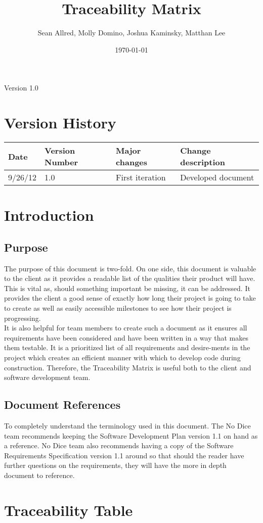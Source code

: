\documentclass [landscape, 12pt] {article}
\title{Traceability Matrix}
\author{Sean Allred, Molly Domino, Joshua Kaminsky, Matthan Lee}
\date{\today}
\newcommand {\tab} {\hspace*{2em}}
\newcommand{\setupintro}{
\renewcommand{\thepage}{}
\maketitle
\begin{center}
\large Version 1.0 \normalsize
\end{center}
\newpage
\setcounter{page}{1}
\renewcommand{\thepage}{\roman{page}}
\tableofcontents 
\newpage
\setcounter{page}{1}
\renewcommand{\thepage}{\arabic{page}}
}
\begin{document}
\setupintro
\section{Version History}
\begin{tabular}{|l|l|l|l|}
\hline
Date & Version Number & Major changes & Change description \\[.5ex] \hline
9/26/12 & 1.0 & First iteration& Developed document \\
\hline

\end {tabular}

\section {Introduction} 
 \subsection {Purpose}
\tab The purpose of this document is two-fold.  On one side, this document is valuable to the client as it provides a readable list of the qualities their product will have.  This is vital as, should something important be missing, it can be addressed.  It provides the client a good sense of exactly how long their project is going to take to create as well as easily accessible milestones to see how their project is progressing.  \\
\tab It is also helpful for team members to create such a document as it ensures all requirements have been considered and have been written in a way that makes them testable.  It is a prioritized list of all requirements and desire-ments in the project which creates an efficient manner with which to develop code during construction.  Therefore, the Traceability Matrix is useful both to the client and software development team.  \\
	 \subsection {Document References}
		\tab To completely understand the terminology used in this document.  The No Dice team recommends keeping the Software Development Plan version 1.1 on hand as a reference.  No Dice team also recommends having a copy of the Software Requirements Specification version 1.1 around so that should the reader have further questions on the requirements, they will have the more in depth document to reference.  

\section {Traceability Table} 
\end{document}
